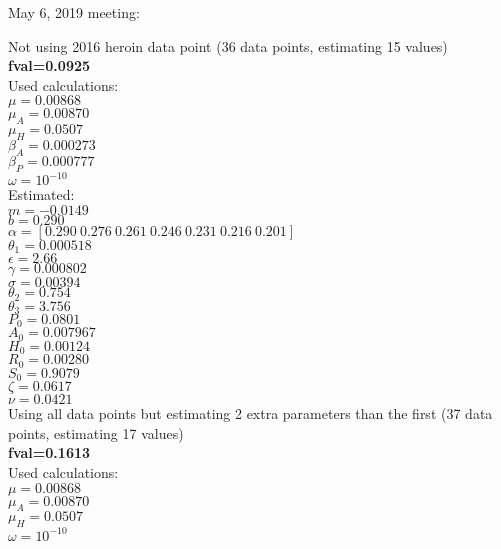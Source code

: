 \documentclass[12pt]{article}
\begin{document}
\pagebreak
May 6, 2019 meeting: 

\begin{multicols}{2}
Not using 2016 heroin data point (36 data points, estimating 15 values) \\
\textbf{fval=0.0925} \\
Used calculations: \\
$\mu=0.00868$ \\
$\mu_{A}=0.00870$ \\
$\mu_{H}=0.0507$ \\
$\beta_A=0.000273$ \\
$\beta_P=0.000777$ \\
$\omega=10^{-10}$ \\ 

Estimated: \\
$m=-0.0149$ \\
$b=0.290$\\
$\alpha=[0.290  \   0.276  \   0.261    \   0.246 \    0.231    \     0.216  \  0.201  ]$ \\
$\theta_1=0.000518 $\\
$\epsilon=2.66$ \\
$\gamma=0.000802$\\
$\sigma=0.00394$ \\
$\theta_2=0.754$  \\
$\theta_3=3.756$ \\
$P_0=0.0801$ \\
$A_0=0.007967$ \\
$H_0=0.00124$ \\
$R_0=0.00280$ \\
$S_0=0.9079$ \\
$\zeta=0.0617$ \\
$\nu=0.0421$ \\ 


\columnbreak
Using all data points but estimating 2 extra parameters than the first (37 data points, estimating 17 values) \\
\textbf{fval=0.1613} \\
Used calculations: \\
$\mu=0.00868$ \\
$\mu_{A}=0.00870$ \\
$\mu_{H}=0.0507$ \\
$\omega=10^{-10}$ \\ 
\vspace{0.6cm}


\end{multicols}
\end{document}

